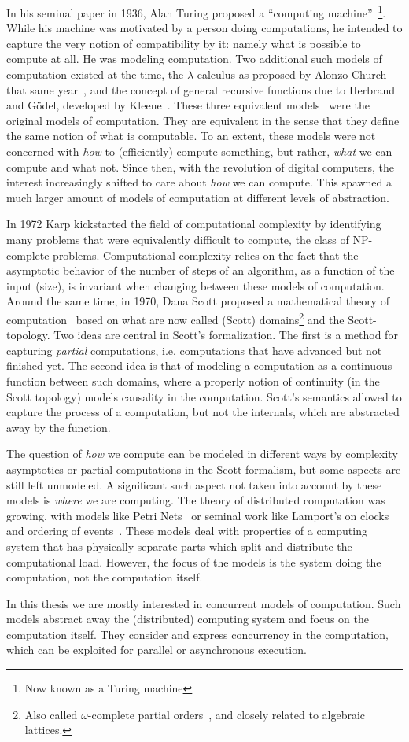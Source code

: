In his seminal paper in 1936, Alan Turing proposed a ``computing machine''~\cite{turing1936computable}\footnote{Now known as a Turing machine}.   
While his machine was motivated by a person doing computations, he intended to capture the very notion of compatibility by it: namely what is possible to compute at all.
He was modeling computation.
Two additional such models of computation existed at the time, the $\lambda$-calculus as proposed by Alonzo Church that same year~\cite{church1936unsolvable}, and the concept of general recursive functions due to Herbrand and Gödel, developed by Kleene~\cite{kleene1936recursive}.
These three equivalent models~\cite{turing1937computability} were the original models of computation.
They are equivalent in the sense that they define the same notion of what is computable.
To an extent, these models were not concerned with \emph{how} to (efficiently) compute something, but rather, \emph{what} we can compute and what not.
Since then, with the revolution of digital computers, the interest increasingly shifted to care about \emph{how} we can compute.
This spawned a much larger amount of models of computation at different levels of abstraction.

In 1972 Karp\cite{karp1972reducibility} kickstarted the field of computational complexity by identifying many problems that were equivalently difficult to compute, the class of NP-complete problems.
Computational complexity relies on the fact that the asymptotic behavior of the number of steps of an algorithm, as a function of the input (size), is invariant when changing between these models of computation.
Around the same time, in 1970, Dana Scott proposed a mathematical theory of computation~\cite{scott1970} based on what are now called (Scott) domains\footnote{Also called $\omega$-complete partial orders~\cite{gunter}, and closely related to algebraic lattices.} and the Scott-topology. 
Two ideas are central in Scott's formalization. The first is a method for capturing \emph{partial} computations, i.e. computations that have advanced but not finished yet.
The second idea is that of modeling a computation as a continuous function between such domains, where a properly notion of continuity (in the Scott topology) models causality in the computation.
Scott's semantics allowed to capture the process of a computation, but not the internals, which are abstracted away by the function. 

The question of \emph{how} we compute can be modeled in different ways by complexity asymptotics or partial computations in the Scott formalism, but some aspects are still left unmodeled.
A significant such aspect not taken into account by these models is \emph{where} we are computing.
The theory of distributed computation was growing, with models like Petri Nets~\cite{petri1962nets} or seminal work like Lamport's on clocks and ordering of events~\cite{Lamport78time}.
These models deal with properties of a computing system that has physically separate parts which split and distribute the computational load.
However, the focus of the models is the system doing the computation, not the computation itself.

In this thesis we are mostly interested in concurrent models of computation. 
Such models abstract away the (distributed) computing system and focus on the computation itself. 
They consider and express concurrency in the computation, which can be exploited for parallel or asynchronous execution.
